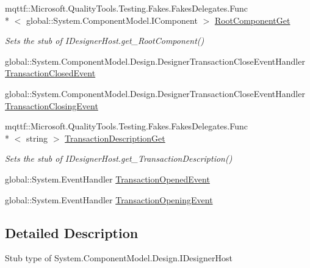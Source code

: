 \begin{DoxyCompactItemize}
mqttf\-::\-Microsoft.\-Quality\-Tools.\-Testing.\-Fakes.\-Fakes\-Delegates.\-Func\\*
$<$ global\-::\-System.\-Component\-Model.\-I\-Component $>$ \hyperlink{class_system_1_1_component_model_1_1_design_1_1_fakes_1_1_stub_i_designer_host_a2a8ee9dc7896ed7b00e3ff719c47e323}{Root\-Component\-Get}
\begin{DoxyCompactList}\small\item\em Sets the stub of I\-Designer\-Host.\-get\-\_\-\-Root\-Component()\end{DoxyCompactList}\item 
global\-::\-System.\-Component\-Model.\-Design.\-Designer\-Transaction\-Close\-Event\-Handler \hyperlink{class_system_1_1_component_model_1_1_design_1_1_fakes_1_1_stub_i_designer_host_ac64ab596725453d7bee63b7c10517049}{Transaction\-Closed\-Event}
\item 
global\-::\-System.\-Component\-Model.\-Design.\-Designer\-Transaction\-Close\-Event\-Handler \hyperlink{class_system_1_1_component_model_1_1_design_1_1_fakes_1_1_stub_i_designer_host_a89e9e689f507bc9994fd176af3d94a5e}{Transaction\-Closing\-Event}
\item 
mqttf\-::\-Microsoft.\-Quality\-Tools.\-Testing.\-Fakes.\-Fakes\-Delegates.\-Func\\*
$<$ string $>$ \hyperlink{class_system_1_1_component_model_1_1_design_1_1_fakes_1_1_stub_i_designer_host_a7f024dce6970ad5af1efdb2d112d8c35}{Transaction\-Description\-Get}
\begin{DoxyCompactList}\small\item\em Sets the stub of I\-Designer\-Host.\-get\-\_\-\-Transaction\-Description()\end{DoxyCompactList}\item 
global\-::\-System.\-Event\-Handler \hyperlink{class_system_1_1_component_model_1_1_design_1_1_fakes_1_1_stub_i_designer_host_aaa7ac7d89d090e04f5c30ebab2332513}{Transaction\-Opened\-Event}
\item 
global\-::\-System.\-Event\-Handler \hyperlink{class_system_1_1_component_model_1_1_design_1_1_fakes_1_1_stub_i_designer_host_a16b0ada4e9919d0ba3ba1d0930adcd48}{Transaction\-Opening\-Event}
\end{DoxyCompactItemize}


\subsection{Detailed Description}
Stub type of System.\-Component\-Model.\-Design.\-I\-Designer\-Host



